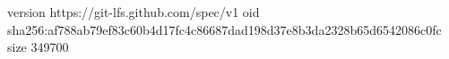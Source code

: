 version https://git-lfs.github.com/spec/v1
oid sha256:af788ab79ef83c60b4d17fc4c86687dad198d37e8b3da2328b65d6542086c0fc
size 349700
